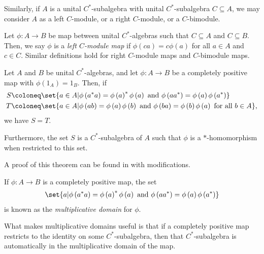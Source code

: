Similarly, if $A$ is a unital $C^{\ast}$-subalgebra with unital $C^{\ast}$-subalgebra $C\subseteq A$, we may consider $A$ as a left $C$-module, or a right $C$-module, or a $C$-bimodule. 
\begin{definition}
  Let $\phi\colon A\rightarrow B$ be map between unital $C^{\ast}$-algebras such that $C\subseteq A$ and $C\subseteq B$. Then, we say $\phi$ is a \textit{left $C$-module map} if $\phi\left( ca \right) = c\phi\left( a \right)$ for all $a\in A$ and $c\in C$. Similar definitions hold for right $C$-module maps and $C$-bimodule maps.
\end{definition}
\begin{theorem}\label{thm:preview_multiplicative_domain}
  Let $A$ and $B$ be unital $C^{\ast}$-algebras, and let $\phi\colon A\rightarrow B$ be a completely positive map with $\phi\left(1_A\right) = 1_B$. Then, if
  \begin{align*}
    S &\coloneq\set{a\in A | \phi\left( a^{\ast}a \right) = \phi\left( a \right)^{\ast}\phi\left( a \right)\text{ and }\phi\left( aa^{\ast} \right) = \phi\left( a \right)\phi\left( a^{\ast} \right)}\\
      T&\coloneq \set{a\in A | \phi\left( ab \right) = \phi\left( a \right)\phi\left( b \right)\text{ and }\phi\left( ba \right) = \phi\left( b \right)\phi\left( a \right)\text{ for all }b\in A},
  \end{align*}
  we have $S = T$.\newline

  Furthermore, the set $S$ is a $C^{\ast}$-subalgebra of $A$ such that $\phi$ is a $\ast$-homomorphism when restricted to this set.
\end{theorem}
A proof of this theorem can be found in \cite{completely_bounded_maps_and_operator_algebras} with modifications. 
\begin{definition}
  If $\phi\colon A\rightarrow B$ is a completely positive map, the set
  \begin{align*}
    \set{a | \phi\left( a^{\ast}a \right) = \phi\left( a \right)^{\ast}\phi\left( a \right)\text{ and }\phi\left( aa^{\ast} \right) = \phi\left( a \right)\phi\left( a^{\ast} \right)}
  \end{align*}
  is known as the \textit{multiplicative domain} for $\phi$.
\end{definition}
What makes multiplicative domains useful is that if a completely positive map restricts to the identity on some $C^{\ast}$-subalgebra, then that $C^{\ast}$-subalgebra is automatically in the multiplicative domain of the map.
